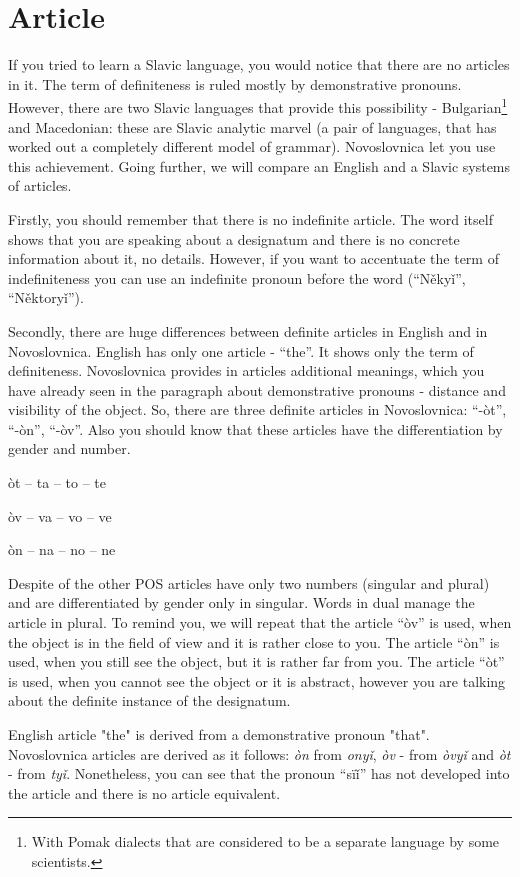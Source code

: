 \section{Article}

If you tried to learn a Slavic language, you would notice that there are no articles in it. The term of definiteness is ruled mostly by demonstrative pronouns. However, there are two Slavic languages that provide this possibility - Bulgarian\footnote{With Pomak dialects that are considered to be a separate language by some scientists.} and Macedonian: these are Slavic analytic marvel (a pair of languages, that has worked out a completely different model of grammar). Novoslovnica let you use this achievement. Going further, we will compare an English and a Slavic systems of articles.

Firstly, you should remember that there is no indefinite article. The word itself shows that you are speaking about a designatum and there is no concrete information about it, no details. However, if you want to accentuate the term of indefiniteness you can use an indefinite pronoun before the word (“Někyǐ”, “Něktoryǐ”).

Secondly, there are huge differences between definite articles in English and in Novoslovnica. English has only one article - “the”. It shows only the term of definiteness. Novoslovnica provides in articles additional meanings, which you have already seen in the paragraph about demonstrative pronouns - distance and visibility of the object. So, there are three definite articles in Novoslovnica: “-òt”, “-òn”, “-òv”. Also you should know that these articles have the differentiation by gender and number. 

òt – ta – to – te

òv – va – vo – ve

òn – na – no – ne

Despite of the other POS articles have only two numbers (singular and plural) and are differentiated by gender only in singular. Words in dual manage the article in plural. To remind you, we will repeat that the article “òv” is used, when the object is in the field of view and it is rather close to you. The article “òn” is used, when you still see the object, but it is rather far from you. The article “òt” is used, when you cannot see the object or it is abstract, however you are talking about the definite instance of the designatum.

English article "the" is derived from a demonstrative pronoun "that". Novoslovnica articles are derived as it follows: \textit{òn} from \textit{onyǐ}, \textit{òv} - from \textit{òvyǐ} and \textit{òt} - from \textit{tyǐ}. Nonetheless, you can see that the pronoun “sïǐ” has not developed into the article and there is no article equivalent.


